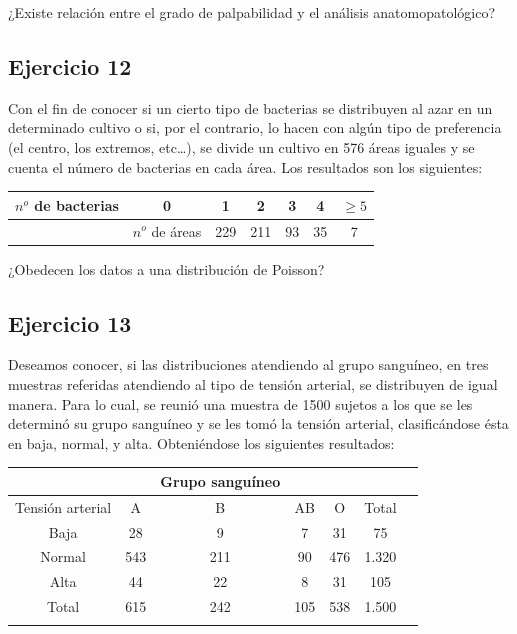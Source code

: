 \documentclass[
]{article}
\begin{document}
¿Existe relación entre el grado de palpabilidad y el análisis anatomopatológico?

\subsection{Ejercicio 12}\label{ejercicio-12}

Con el fin de conocer si un cierto tipo de bacterias se distribuyen al azar en un determinado cultivo o si, por el contrario, lo hacen con algún tipo de preferencia (el centro, los extremos, etc\ldots), se divide un cultivo en 576 áreas iguales y se cuenta el número de bacterias en cada área. Los resultados son los siguientes:

\begin{longtable}[]{@{}ccccccc@{}}
\toprule\noalign{}
\(n^{o}\) de bacterias & 0 & 1 & 2 & 3 & 4 & \(\geq 5\) \\
\midrule\noalign{}
\endhead
\bottomrule\noalign{}
\endlastfoot
& \(n^{o}\) de áreas & 229 & 211 & 93 & 35 & 7 \\
\end{longtable}

¿Obedecen los datos a una distribución de Poisson?

\subsection{Ejercicio 13}\label{ejercicio-13}

Deseamos conocer, si las distribuciones atendiendo al grupo sanguíneo, en tres muestras referidas atendiendo al tipo de tensión arterial, se distribuyen de igual manera. Para lo cual, se reunió una muestra de 1500 sujetos a los que se les determinó su grupo sanguíneo y se les tomó la tensión arterial, clasificándose ésta en baja, normal, y alta. Obteniéndose los siguientes resultados:

\begin{longtable}[]{@{}ccccccc@{}}
\toprule\noalign{}
& & Grupo sanguíneo & & & & \\
\midrule\noalign{}
\endhead
\bottomrule\noalign{}
\endlastfoot
Tensión arterial & A & B & AB & O & Total & \\
Baja & 28 & 9 & 7 & 31 & 75 & \\
Normal & 543 & 211 & 90 & 476 & 1.320 & \\
Alta & 44 & 22 & 8 & 31 & 105 & \\
Total & 615 & 242 & 105 & 538 & 1.500 & \\
& & & & & & \\
\end{longtable}
\end{document}
